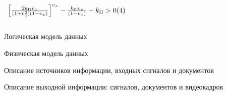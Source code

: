 \documentclass{beamer}
\begin{document}
\begin{frame}
\begin{columns}[c]
\begin{column}{0.56\linewidth}
{\begin{math}
\begin{array}{l}
        \left[
            \frac%
                { 2 k_\Pi \upsilon_x }%
                { \left( 1 + \upsilon^2_x \right) \left( 1 - \upsilon_x \right) }
        \right]^{ \upsilon_x }
        -
        \frac%
            { k_\Pi \upsilon_x }%
            { \left( 1 - \upsilon_x \right) }
        -
        k_\Pi > 0 \hfill (4)
    \end{array}
\end{math}
}
        \end{column}
    \end{columns}
\end{frame}

\begin{frame}
	{Логическая модель данных}
\end{frame}

\begin{frame}
	{Физическая модель данных}
\end{frame}

\begin{frame}
	{Описание источников информации, входных сигналов и документов}
\end{frame}

\begin{frame}
	{Описание выходной информации: сигналов, документов и видеокадров}
\end{frame}
\end{document}
